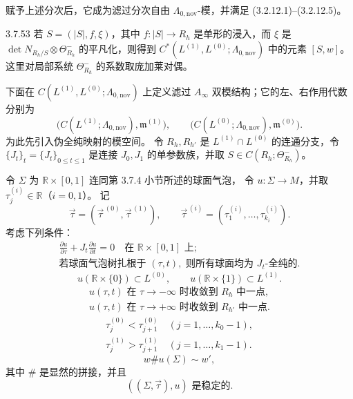 赋予上述分次后，它成为滤过分次自由 $\Lambda_{0,\mathrm{nov}}$-模，并满足
(3.2.12.1)--(3.2.12.5)。

\begin{remark}{3.7.53}\label{rem:3-7-53}
若 $S=(|S|,f,\xi)$，其中 $f\colon|S|\to R_h$ 是单形的浸入，而 $\xi$ 是
$\det N_{R_h/S}\otimes\Theta^-_{R_h}$ 的平凡化，则得到
$C^*(L^{(1)},L^{(0)};\Lambda_{0,\mathrm{nov}})$ 中的元素 $[S,w]$。
这里对局部系统 $\Theta^-_{R_h}$ 的系数取庞加莱对偶。
\end{remark}

下面在 $C(L^{(1)},L^{(0)};\Lambda_{0,\mathrm{nov}})$ 上定义滤过
$A_\infty$ 双模结构；它的左、右作用代数分别为
\[
 \bigl(C(L^{(1)};\Lambda_{0,\mathrm{nov}}),\mathfrak m^{(1)}\bigr),
 \qquad
 \bigl(C(L^{(0)};\Lambda_{0,\mathrm{nov}}),\mathfrak m^{(0)}\bigr).
\]
为此先引入伪全纯映射的模空间。
令 $R_h,R_{h'}$ 是 $L^{(1)}\cap L^{(0)}$ 的连通分支，令
$\{J_t\}_t=\{J_t\}_{0\leq t\leq1}$ 是连接 $J_0,J_1$ 的单参数族，并取
$S\in C(R_h;\Theta^-_{R_h})$。

令 $\Sigma$ 为 $\mathbb R\times[0,1]$ 连同第 3.7.4 小节所述的球面气泡，
令 $u\colon\Sigma\to M$，并取 $\tau_j^{(i)}\in\mathbb R$（$i=0,1$）。
记
\[
 \vec\tau=(\vec\tau^{\,(0)},\vec\tau^{\,(1)}),
 \qquad
 \vec\tau^{\,(i)}
 =(\tau_1^{(i)},\ldots,\tau_{k_i}^{(i)}).
\]
考虑下列条件：
\begin{equation}
\begin{gathered}
 \frac{\partial u}{\partial\tau}
 +J_t\frac{\partial u}{\partial t}=0
 \quad\text{在 }\mathbb R\times[0,1]\text{ 上};\\
 \text{若球面气泡树扎根于 }(\tau,t),
 \text{ 则所有球面均为 }J_t\text{-全纯的}.
\end{gathered}
\tag{3.7.54.1}\label{eq:3-7-54-1}
\end{equation}
\begin{equation}
 u(\mathbb R\times\{0\})\subset L^{(0)},\qquad
 u(\mathbb R\times\{1\})\subset L^{(1)}.
\tag{3.7.54.2}\label{eq:3-7-54-2}
\end{equation}
\begin{equation}
\begin{gathered}
 u(\tau,t)\text{ 在 }\tau\to-\infty\text{ 时收敛到 }R_h\text{ 中一点},\\
 u(\tau,t)\text{ 在 }\tau\to+\infty\text{ 时收敛到 }R_{h'}\text{ 中一点}.
\end{gathered}
\tag{3.7.54.3}\label{eq:3-7-54-3}
\end{equation}
\begin{equation}
\begin{gathered}
 \tau_j^{(0)}<\tau_{j+1}^{(0)}
 \quad(j=1,\ldots,k_0-1),\\
 \tau_j^{(1)}>\tau_{j+1}^{(1)}
 \quad(j=1,\ldots,k_1-1).
\end{gathered}
\tag{3.7.54.4}\label{eq:3-7-54-4}
\end{equation}
\begin{equation}
 w\#u(\Sigma)\sim w',
\tag{3.7.54.5}\label{eq:3-7-54-5}
\end{equation}
其中 $\#$ 是显然的拼接，并且
\begin{equation}
 ((\Sigma,\vec\tau),u)\text{ 是稳定的}.
\tag{3.7.54.6}\label{eq:3-7-54-6}
\end{equation}


